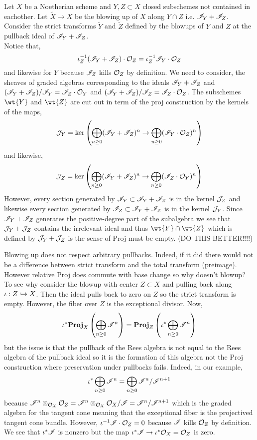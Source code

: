 \documentclass[12pt]{article}
\begin{document}
Let $X$ be a Noetherian scheme and $Y,Z \subset X$ closed subschemes not contained in eachother. Let $\tilde{X} \to X$ be the blowing up of $X$ along $Y \cap Z$ i.e. $\mathscr{I}_Y + \mathscr{I}_Z$. Consider the strict transforms $\tilde{Y}$ and $\tilde{Z}$ defined by the blowups of $Y$ and $Z$ at the pullback ideal of $\mathscr{I}_Y + \mathscr{I}_Z$.
\bigskip\\
Notice that,
\[ \iota_Z^{-1} (\mathscr{I}_Y + \mathscr{I}_Z) \cdot \mathcal{O}_{Z} = \iota_Z^{-1} \mathscr{I}_Y \cdot \mathcal{O}_{Z} \]
and likewise for $Y$ because $\mathscr{I}_Z$ kills $\mathcal{O}_{Z}$ by definition. We need to consider, the sheaves of graded algebras corresponding to the ideals $\mathscr{I}_Y + \mathscr{I}_Z$ and $(\mathscr{I}_Y + \mathscr{I}_Z) / \mathscr{I}_Y = \mathscr{I}_Z \cdot \mathcal{O}_{Y}$ and $(\mathscr{I}_Y + \mathscr{I}_Z) / \mathscr{I}_Z = \mathscr{I}_Z \cdot \mathcal{O}_{Z}$. The subschemes $\wt{Y}$ and $\wt{Z}$ are cut out in term of the proj construction by the kernels of the maps,
\[ \mathcal{J}_Y = \ker{ \left( \bigoplus_{n \ge 0} (\mathscr{I}_Y + \mathscr{I}_Z)^n \to \bigoplus_{n \ge 0} (\mathscr{I}_Y \cdot \mathcal{O}_{Z})^n \right)} \]
and likewise, 
\[ \mathcal{J}_Z = \ker{ \left( \bigoplus_{n \ge 0} (\mathscr{I}_Y + \mathscr{I}_Z)^n \to \bigoplus_{n \ge 0} (\mathscr{I}_Z \cdot \mathcal{O}_{Y})^n \right)} \]
However, every section generated by $\mathscr{I}_Y \subset \mathscr{I}_Y + \mathscr{I}_Z$ is in the kernel $\mathcal{J}_Z$ and likewise every section generated by $\mathscr{I}_Z \subset \mathscr{I}_Y + \mathscr{I}_Z$ is in the kernel $\mathcal{J}_Y$. Since $\mathscr{I}_Y + \mathscr{I}_Z$ generates the positive-degree part of the subalgebra we see that $\mathcal{J}_Y + \mathcal{J}_Z$ contains the irrelevant ideal and thus $\wt{Y} \cap \wt{Z}$ which is defined by $\mathcal{J}_Y + \mathcal{J}_Z$ is the sense of Proj must be empty. (DO THIS BETTER!!!!)

\begin{rmk}
Blowing up does not respect arbitrary pullbacks. Indeed, if it did there would not be a difference between strict transform and the total transform (preimage). However relative Proj does commute with base change so why doesn't blowup? To see why consider the blowup with center $Z \subset X$ and pulling back along $\iota : Z \hookrightarrow X$. Then the ideal pulls back to zero on $Z$ so the strict transform is empty. However, the fiber over $Z$ is the exceptional divisor. Now,
\[ \iota^* \mathbf{Proj}_{X}\left( \bigoplus_{n \ge 0} \mathscr{I}^n \right) = \mathbf{Proj}_{Z}\left( \iota^* \bigoplus_{n \ge 0} \mathscr{I}^n  \right) \]
but the issue is that the pullback of the Rees algebra is not equal to the Rees algebra of the pullback ideal so it is the formation of this algebra not the Proj construction where preservation under pullbacks fails. Indeed, in our example,
\[ \iota^* \bigoplus_{n \ge 0} \mathscr{I}^n = \bigoplus_{n \ge 0} \mathscr{I}^n / \mathscr{I}^{n+1} \]
because $\mathscr{I}^n \otimes_{\mathcal{O}_{X}} \mathcal{O}_{Z} = \mathscr{I}^n \otimes_{\mathcal{O}_{X}} \mathcal{O}_{X} / \mathscr{I} = \mathscr{I}^n / \mathscr{I}^{n+1}$ which is the graded algebra for the tangent cone meaning that the exceptional fiber is the projectived tangent cone bundle. However, $\iota^{-1} \mathscr{I} \cdot \mathcal{O}_{Z} = 0$ because $\mathscr{I}$ kills $\mathcal{O}_{Z}$ by definition. We see that $\iota^* \mathscr{I}$ is nonzero but the map $\iota^* \mathscr{I} \to \iota^* \mathcal{O}_{X} = \mathcal{O}_{Z}$ is zero. 
\end{rmk}
\end{document}
